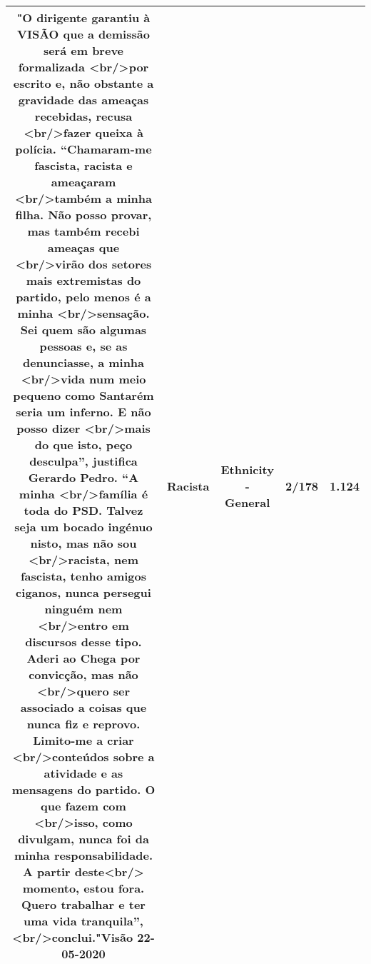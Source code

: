 \documentclass[11pt]{article}
\newlength\mylength
\begin{document}
\begin{center}
\begin{longtable}{|C{.65\mylength}|C{.30\mylength}|C{.12\mylength}|C{.12\mylength}|C{.12\mylength}|}
  \small "O dirigente garantiu à VISÃO que a demissão será em breve formalizada <br/>por escrito e, não obstante a gravidade das ameaças recebidas, recusa <br/>fazer queixa à polícia. “Chamaram-me fascista, \textbf{racista} e ameaçaram <br/>também a minha filha. Não posso provar, mas também recebi ameaças que <br/>virão dos setores mais extremistas do partido, pelo menos é a minha <br/>sensação.  Sei quem são algumas pessoas e, se as denunciasse, a minha <br/>vida num meio pequeno como Santarém seria um inferno. E não posso dizer <br/>mais do que isto, peço desculpa”, justifica Gerardo Pedro. “A minha <br/>família é toda do PSD. Talvez seja um bocado ingénuo nisto, mas não sou <br/>\textbf{racista}, nem fascista, tenho amigos ciganos, nunca persegui ninguém nem <br/>entro em discursos desse tipo. Aderi ao Chega por convicção, mas não <br/>quero ser associado a coisas que nunca fiz e reprovo. Limito-me a criar <br/>conteúdos sobre a atividade e as mensagens do partido. O que fazem com <br/>isso, como divulgam, nunca foi da minha responsabilidade. A partir deste<br/> momento, estou fora. Quero trabalhar e ter uma vida tranquila”, <br/>conclui."Visão 22-05-2020\normalsize   & Racista & Ethnicity - General & 2/178 & 1.124 \\  \hline
  
\end{longtable}
\end{center}
\end{document}
